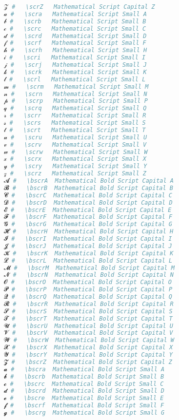 \begin{lstlisting}[language=Julia, style=julia]
𝒵 #   \scrZ   Mathematical Script Capital Z
𝒶 #   \scra   Mathematical Script Small A
𝒷 #   \scrb   Mathematical Script Small B
𝒸 #   \scrc   Mathematical Script Small C
𝒹 #   \scrd   Mathematical Script Small D
𝒻 #   \scrf   Mathematical Script Small F
𝒽 #   \scrh   Mathematical Script Small H
𝒾 #   \scri   Mathematical Script Small I
𝒿 #   \scrj   Mathematical Script Small J
𝓀 #   \scrk   Mathematical Script Small K
𝓁 #   \scrl   Mathematical Script Small L
𝓂 #   \scrm   Mathematical Script Small M
𝓃 #   \scrn   Mathematical Script Small N
𝓅 #   \scrp   Mathematical Script Small P
𝓆 #   \scrq   Mathematical Script Small Q
𝓇 #   \scrr   Mathematical Script Small R
𝓈 #   \scrs   Mathematical Script Small S
𝓉 #   \scrt   Mathematical Script Small T
𝓊 #   \scru   Mathematical Script Small U
𝓋 #   \scrv   Mathematical Script Small V
𝓌 #   \scrw   Mathematical Script Small W
𝓍 #   \scrx   Mathematical Script Small X
𝓎 #   \scry   Mathematical Script Small Y
𝓏 #   \scrz   Mathematical Script Small Z
𝓐 #   \bscrA  Mathematical Bold Script Capital A
𝓑 #   \bscrB  Mathematical Bold Script Capital B
𝓒 #   \bscrC  Mathematical Bold Script Capital C
𝓓 #   \bscrD  Mathematical Bold Script Capital D
𝓔 #   \bscrE  Mathematical Bold Script Capital E
𝓕 #   \bscrF  Mathematical Bold Script Capital F
𝓖 #   \bscrG  Mathematical Bold Script Capital G
𝓗 #   \bscrH  Mathematical Bold Script Capital H
𝓘 #   \bscrI  Mathematical Bold Script Capital I
𝓙 #   \bscrJ  Mathematical Bold Script Capital J
𝓚 #   \bscrK  Mathematical Bold Script Capital K
𝓛 #   \bscrL  Mathematical Bold Script Capital L
𝓜 #   \bscrM  Mathematical Bold Script Capital M
𝓝 #   \bscrN  Mathematical Bold Script Capital N
𝓞 #   \bscrO  Mathematical Bold Script Capital O
𝓟 #   \bscrP  Mathematical Bold Script Capital P
𝓠 #   \bscrQ  Mathematical Bold Script Capital Q
𝓡 #   \bscrR  Mathematical Bold Script Capital R
𝓢 #   \bscrS  Mathematical Bold Script Capital S
𝓣 #   \bscrT  Mathematical Bold Script Capital T
𝓤 #   \bscrU  Mathematical Bold Script Capital U
𝓥 #   \bscrV  Mathematical Bold Script Capital V
𝓦 #   \bscrW  Mathematical Bold Script Capital W
𝓧 #   \bscrX  Mathematical Bold Script Capital X
𝓨 #   \bscrY  Mathematical Bold Script Capital Y
𝓩 #   \bscrZ  Mathematical Bold Script Capital Z
𝓪 #   \bscra  Mathematical Bold Script Small A
𝓫 #   \bscrb  Mathematical Bold Script Small B
𝓬 #   \bscrc  Mathematical Bold Script Small C
𝓭 #   \bscrd  Mathematical Bold Script Small D
𝓮 #   \bscre  Mathematical Bold Script Small E
𝓯 #   \bscrf  Mathematical Bold Script Small F
𝓰 #   \bscrg  Mathematical Bold Script Small G

\end{lstlisting}
